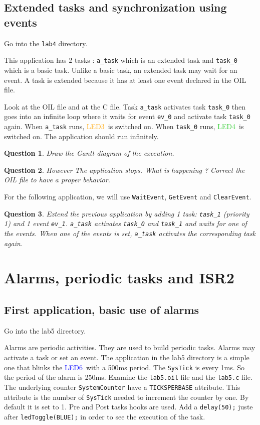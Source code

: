 \documentclass[11pt]{article}
\newtheorem{ex}{Question}
\newcommand{\LEDorange}{\textcolor{orange}{LED3}}
\newcommand{\LEDgreen}{\textcolor{LimeGreen}{LED4}}
\newcommand{\LEDblue}{\textcolor{blue}{LED6}}
\begin{document}
\subsection{Extended tasks and synchronization using events}

Go into the \lstinline{lab4} directory.

This application has 2 tasks : \lstinline{a_task} which is an extended task and \lstinline{task_0} which is a basic task. Unlike a basic task, an extended task may wait for an event. A task is extended because it has at least one event declared in the OIL file.

Look at the OIL file and at the C file. Task \lstinline{a_task} activates task \lstinline{task_0} then goes into an infinite loop where it waits for event \lstinline{ev_0} and activate task \lstinline{task_0} again. When \lstinline{a_task} runs, \LEDorange\ is switched on. When \lstinline{task_0} runs, \LEDgreen\ is switched on. The application should run infinitely. 

\begin{ex}
Draw the Gantt diagram of the execution.
\end{ex}

\begin{ex}
However The application stops. What is happening ? Correct the OIL file to have a proper behavior.
\end{ex}

For the following application, we will use \lstinline{WaitEvent}, \lstinline{GetEvent} and \lstinline{ClearEvent}.
\begin{ex}
Extend the previous application by adding 1 task: \texttt{task_1} (priority 1) and 1 event \texttt{ev_1}. \texttt{a_task} activates \texttt{task_0} and \texttt{task_1} and waits for one of the events. When one of the events is set, \texttt{a_task} activates the corresponding task again.
\end{ex}

\section{Alarms, periodic tasks and ISR2}

\subsection{First application, basic use of alarms}

Go into the lab5 directory.

Alarms are periodic activities. They are used to build periodic tasks. Alarms may activate a task or set an event. The application in the lab5 directory is a simple one that blinks the \LEDblue\ with a 500ms period. The \lstinline{SysTick} is every 1ms. So the period of the alarm is 250ms. Examine the \lstinline{lab5.oil} file and the \lstinline{lab5.c} file. The underlying counter \lstinline{SystemCounter} have a \lstinline{TICKSPERBASE} attribute. This attribute is the number of \lstinline{SysTick} needed to increment the counter by one. By default it is set to 1. Pre and Post tasks hooks are used. Add a \lstinline{delay(50);} juste after \lstinline{ledToggle(BLUE);} in order to see the execution of the task.
\end{document}
